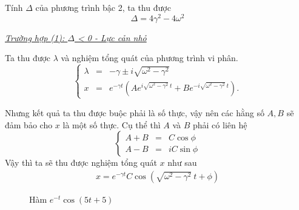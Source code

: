 \documentclass[12pt]{article}
\begin{document}
Tính \(\Delta\) của phương trình bậc 2, ta thu được
\begin{equation}
    \Delta = 4 \gamma^2 - 4 \omega^2
    \label{eq:1.10}
\end{equation}
\vspace{2mm}

\underline{\textit{Trường hợp (1): $\Delta$ < 0 - Lực cản nhỏ}}

Ta thu được \(\lambda\) và nghiệm tổng quát của phương trình vi phân.
\begin{equation}
    \left\{
    \begin{array}{ccc}
    \lambda &=& - \gamma \pm  i \sqrt{\omega^2 - \gamma^2} \\
    x &=& e^{-\gamma t} \left(A e^{i\sqrt{\omega^2 - \gamma^2} \ t} + B e^{- i\sqrt{\omega^2 - \gamma^2} \ t} \right).
    \end{array}
    \right.
    \label{eq:1.11}
\end{equation}

Nhưng kết quả ta thu được buộc phải là số thực, vậy nên các hằng số $A, B$ sẽ đảm bảo cho $x$ là một số thực. Cụ thể thì $A$ và $B$ phải có liên hệ
\begin{equation*}
    \left\{
    \begin{array}{ccc}
    A + B &=& C \cos \phi \\
    A - B &=& i C \sin \phi
    \end{array}
    \right.
\end{equation*}
Vậy thì ta sẽ thu được nghiệm tổng quát \(x\) như sau
\begin{equation}
\begin{split}
    x = e^{-\gamma t} C \cos{\left(\sqrt{\omega^2 - \gamma^2} \ t + \phi \right)}
\end{split}
\label{eq:1.12}
\end{equation}

\begin{figure}[!htb]
    \centering
    \caption{Hàm \(e^{-t} \cos{\left(5t + 5 \right)}\)}
    \label{fig:1.6}
\end{figure}
\end{document}
